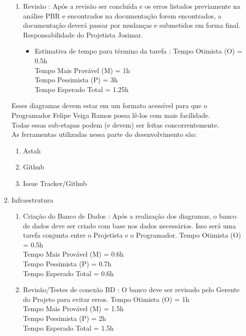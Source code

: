 \documentclass[12pt,a4paper,final]{article}
\begin{document}
\begin{enumerate}
\begin{enumerate}
\item Revisão : Após a revisão ser concluída e os erros listados previamente na análise PBR e encontrados na documentação forem encontrados, a documentação deverá passar por mudanças e submetidos em forma final. Responsabilidade do Projetista Josimar.
\begin{itemize}
\item Estimativa de tempo para término da tarefa :
Tempo Otimista (O) = 0.5h\\
Tempo Mais Provável (M) = 1h\\
Tempo Pessimista (P) = 3h\\
Tempo Esperado Total = 1.25h
\end{itemize} 
\end{enumerate}

Esses diagramas devem estar em um formato acessível para que o Programador Felipe Veiga Ramos possa lê-los com mais facilidade.\\
Todas essas sub-etapas podem (e devem) ser feitas concorrentemente.\\
As ferramentas utilizadas nessa parte do desenvolvimento são:
\begin{enumerate}
\item Astah
\item Github
\item Issue Tracker/Github
\end{enumerate}

\item Infraestrutura
\begin{enumerate}
\item Criação do Banco de Dados : Após a realização dos diagramas, o banco de dados deve ser criado com base nos dados necessários. Isso será uma tarefa conjunta entre o Projetista e o Programador.
Tempo Otimista (O) = 0.5h\\
Tempo Mais Provável (M) = 0.6h\\
Tempo Pessimista (P) = 0.7h\\
Tempo Esperado Total = 0.6h

\item Revisão/Testes de conexão BD : O banco deve ser revisado pelo Gerente do Projeto para evitar erros.
Tempo Otimista (O) = 1h\\
Tempo Mais Provável (M) = 1.5h\\
Tempo Pessimista (P) = 2h\\
Tempo Esperado Total = 1.5h
\end{enumerate}


\end{enumerate}
\end{document}
